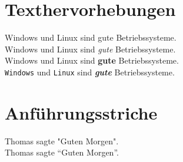 \documentclass[a4paper,12pt]{scrartcl}
\begin{document}
%
\section{Texthervorhebungen}
%
Windows und Linux sind gute Betriebssysteme. \\
%
Windows und Linux sind \emph{gute} Betriebssysteme.  \\
%
Windows und Linux sind \textbf{gute} Betriebssysteme.  \\
%
\texttt{Windows} und \texttt{Linux} sind \emph{\textbf{gute}}
Betriebssysteme.  \\
%
\section{Anführungsstriche}
%
Thomas sagte "Guten Morgen". \\        %
Thomas sagte \enquote{Guten Morgen}.   %
\end{document}
